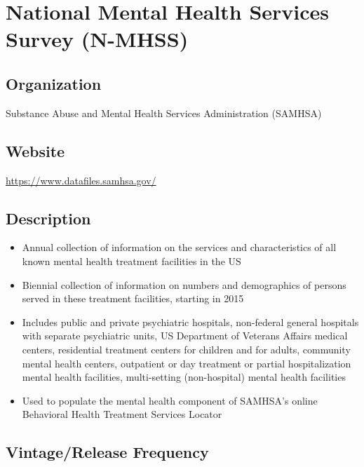 \documentclass[
]{book}
\providecommand{\tightlist}{%
  \setlength{\itemsep}{0pt}\setlength{\parskip}{0pt}}
\begin{document}
\hypertarget{national-mental-health-services-survey-n-mhss}{%
\chapter{National Mental Health Services Survey (N-MHSS)}\label{national-mental-health-services-survey-n-mhss}}

\hypertarget{organization-61}{%
\section{Organization}\label{organization-61}}

Substance Abuse and Mental Health Services Administration (SAMHSA)

\hypertarget{website-61}{%
\section{Website}\label{website-61}}

\url{https://www.datafiles.samhsa.gov/}

\hypertarget{description-61}{%
\section{Description}\label{description-61}}

\begin{itemize}
\tightlist
\item
  Annual collection of information on the services and characteristics of all known mental health treatment facilities in the US
\item
  Biennial collection of information on numbers and demographics of persons served in these treatment facilities, starting in 2015
\item
  Includes public and private psychiatric hospitals, non-federal general hospitals with separate psychiatric units, US Department of Veterans Affairs medical centers, residential treatment centers for children and for adults, community mental health centers, outpatient or day treatment or partial hospitalization mental health facilities, multi-setting (non-hospital) mental health facilities
\item
  Used to populate the mental health component of SAMHSA's online Behavioral Health Treatment Services Locator
\end{itemize}

\hypertarget{vintagerelease-frequency-61}{%
\section{Vintage/Release Frequency}\label{vintagerelease-frequency-61}}
\end{document}
